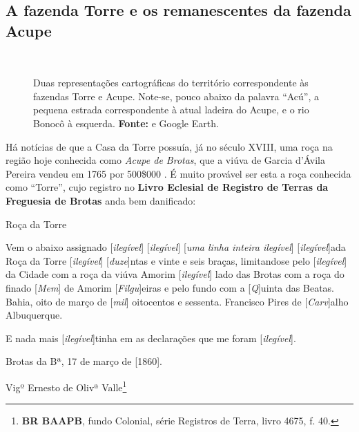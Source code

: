 \begin{citacao}
\subsection{A fazenda Torre e os remanescentes da fazenda Acupe}

\begin{figure}[!htp]
\centering
{}
\  %
\caption{Duas representações cartográficas do território correspondente às fazendas Torre e Acupe. Note-se, pouco abaixo da palavra ``Acú'', a pequena estrada correspondente à atual ladeira do Acupe, e o rio Bonocô à esquerda. \textbf{Fonte:}  e Google Earth.}
\end{figure}

Há notícias de que a Casa da Torre possuía, já no século XVIII, uma roça na região hoje conhecida como \textit{Acupe de Brotas}, que a viúva de Garcia d'Ávila Pereira vendeu em 1765 por 500\$000 \cite[p.~10]{ott_engenhos_1996}. É muito provável ser esta a roça conhecida como ``Torre'', cujo registro no \textbf{Livro Eclesial de Registro de Terras da Freguesia de Brotas} anda bem danificado:

\begin{citacao}
Roça da Torre

Vem o abaixo assignado [\textit{ilegível}] [\textit{ilegível}] [\textit{uma linha inteira ilegível}] [\textit{ilegível}]ada Roça da Torre [\textit{ilegível}] [\textit{duze}]ntas e vinte e seis braças, limitandose pelo [\textit{ilegível}] da Cidade com a roça da viúva Amorim [\textit{ilegível}] lado das Brotas com a roça do finado [\textit{Mem}] de Amorim [\textit{Filgu}]eiras e pelo fundo com a [\textit{Q}]uinta das Beatas. Bahia, oito de março de [\textit{mil}] oitocentos e sessenta. Francisco Pires de [\textit{Carv}]alho Albuquerque. 

E nada mais [\textit{ilegível}]tinha em as declarações que me foram [\textit{ilegível}].

Brotas da Bª, 17 de março de [1860].

Vigº Ernesto de Olivª Valle\footnote{\textbf{BR BAAPB}, fundo Colonial, série Registros de Terra, livro 4675, f. 40.}
\end{citacao}


\end{citacao}

